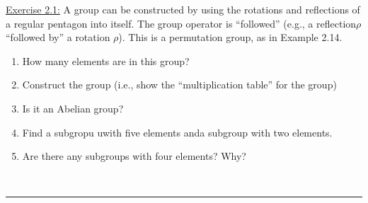 \documentclass{article}
\newcommand{\statementsep}{\leavevmode\\[0.005in] \rule[\baselineskip/4]{\textwidth}{0.4pt}\leavevmode\\[0.005in]}
\begin{document}
\noindent\underline{Exercise 2.1:} A group can be constructed by using the rotations and reflections of a regular pentagon into itself. The group operator is ``followed'' (e.g., a reflection$\rho$ ``followed by'' a rotation $\rho$). This is a permutation group, as in Example 2.14.
\begin{enumerate}
	\item How many elements are in this group?
	\item Construct the group (i.e., show the ``multiplication table'' for the group)
	\item Is it an Abelian group?
	\item Find a subgropu uwith five elements anda subgroup with two elements.
	\item Are there any subgroups with four elements? Why?
\end{enumerate}
\statementsep
\end{document}
